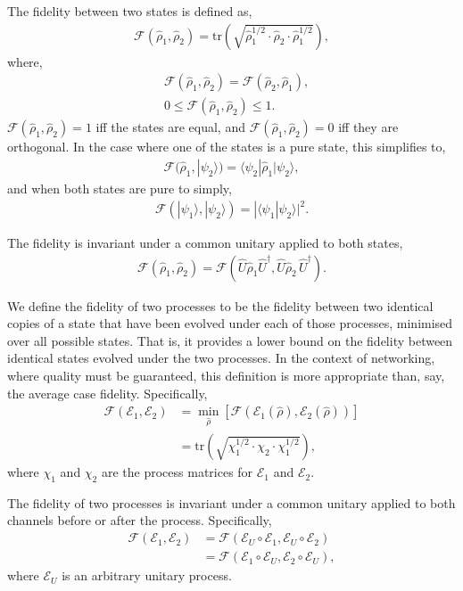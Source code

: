 \documentclass[aps,rmp,twocolumn,amsmath,amssymb,nofootinbib,superscriptaddress]{revtex4}
\newcommand{\bra}[1]{\langle#1|}
\newcommand{\ket}[1]{|#1\rangle}
\newcommand{\comment}[1]{{\color{blue}{\textbf{#1}}}}
\begin{document}
The fidelity between two states is defined as,
\begin{align}
\mathcal{F}(\hat\rho_1,\hat\rho_2) = \mathrm{tr}\left(\sqrt{\hat\rho_1^{1/2}\cdot\hat\rho_2\cdot\hat\rho_1^{1/2}}\right),
\end{align}
where,
\begin{align}
& \mathcal{F}(\hat\rho_1,\hat\rho_2) = \mathcal{F}(\hat\rho_2,\hat\rho_1), \nonumber \\
& 0\leq \mathcal{F}(\hat\rho_1,\hat\rho_2) \leq 1.
\end{align}
\mbox{$\mathcal{F}(\hat\rho_1,\hat\rho_2)=1$} iff the states are equal, and \mbox{$\mathcal{F}(\hat\rho_1,\hat\rho_2)=0$} iff they are orthogonal.
In the case where one of the states is a pure state, this simplifies to,
\begin{align}
\mathcal{F}(\hat\rho_1,\ket{\psi_2}) = \bra{\psi_2}\hat\rho_1\ket{\psi_2},
\end{align}
and when both states are pure to simply,
\begin{align}
\mathcal{F}(\ket{\psi_1},\ket{\psi_2}) = |\langle\psi_1 | \psi_2\rangle|^2.
\end{align}

The fidelity is invariant under a common unitary applied to both states,
\begin{align}
\mathcal{F}(\hat\rho_1,\hat\rho_2) = \mathcal{F}(\hat{U}\hat\rho_1 \hat{U}^\dag,\hat{U} \hat\rho_2\,\hat{U}^\dag).
\end{align}

We define the fidelity of two processes to be the fidelity between two identical copies of a state that have been evolved under each of those processes, minimised over all possible states. That is, it provides a lower bound on the fidelity between identical states evolved under the two processes. In the context of networking, where quality must be guaranteed, this definition is more appropriate than, say, the average case fidelity. Specifically,
\begin{align}
\mathcal{F}(\mathcal{E}_1,\mathcal{E}_2) &= \min_{\hat\rho} \left[\mathcal{F}(\mathcal{E}_1(\hat\rho),\mathcal{E}_2(\hat\rho))\right] \nonumber \\
&= \mathrm{tr}\left(\sqrt{\chi_1^{1/2}\cdot\chi_2\cdot\chi_1^{1/2}}\right),
\end{align}
\comment{CHECK THIS!} where $\chi_1$ and $\chi_2$ are the process matrices for $\mathcal{E}_1$ and $\mathcal{E}_2$.

The fidelity of two processes is invariant under a common unitary applied to both channels before or after the process. Specifically,
\begin{align}
\mathcal{F}(\mathcal{E}_1,\mathcal{E}_2) &= \mathcal{F}(\mathcal{E}_U\circ\mathcal{E}_1,\mathcal{E}_U\circ\mathcal{E}_2) \nonumber \\
&= \mathcal{F}(\mathcal{E}_1\circ \mathcal{E}_U,\mathcal{E}_2\circ \mathcal{E}_U),
\end{align}
where $\mathcal{E}_U$ is an arbitrary unitary process.
\end{document}
